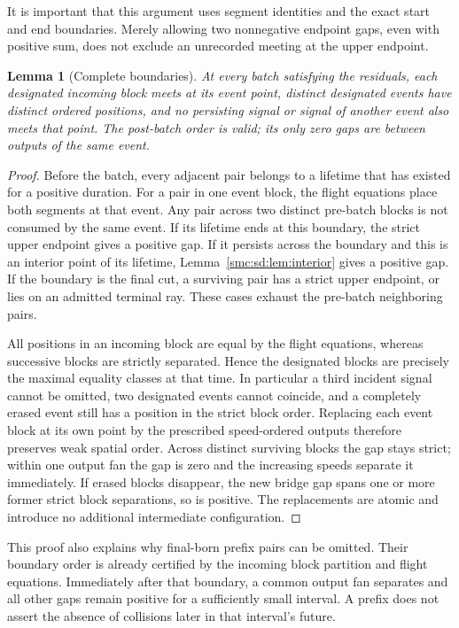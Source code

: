 \documentclass[11pt,letterpaper]{article}
\numberwithin{equation}{section}
\newtheorem{lemma}[theorem]{Lemma}
\theoremstyle{definition}
\theoremstyle{remark}
\begin{document}
It is important that this argument uses segment identities and the exact start and end boundaries. Merely allowing two nonnegative endpoint gaps, even with positive sum, does not exclude an unrecorded meeting at the upper endpoint.

\begin{lemma}[Complete boundaries]\label{smc:sd:lem:boundary}
At every batch satisfying the residuals, each designated incoming block meets at its event point, distinct designated events have distinct ordered positions, and no persisting signal or signal of another event also meets that point. The post-batch order is valid; its only zero gaps are between outputs of the same event.
\end{lemma}
\begin{proof}
Before the batch, every adjacent pair belongs to a lifetime that has existed for a positive duration. For a pair in one event block, the flight equations place both segments at that event. Any pair across two distinct pre-batch blocks is not consumed by the same event. If its lifetime ends at this boundary, the strict upper endpoint gives a positive gap. If it persists across the boundary and this is an interior point of its lifetime, Lemma~\ref{smc:sd:lem:interior} gives a positive gap. If the boundary is the final cut, a surviving pair has a strict upper endpoint, or lies on an admitted terminal ray. These cases exhaust the pre-batch neighboring pairs.

All positions in an incoming block are equal by the flight equations, whereas successive blocks are strictly separated. Hence the designated blocks are precisely the maximal equality classes at that time. In particular a third incident signal cannot be omitted, two designated events cannot coincide, and a completely erased event still has a position in the strict block order. Replacing each event block at its own point by the prescribed speed-ordered outputs therefore preserves weak spatial order. Across distinct surviving blocks the gap stays strict; within one output fan the gap is zero and the increasing speeds separate it immediately. If erased blocks disappear, the new bridge gap spans one or more former strict block separations, so is positive. The replacements are atomic and introduce no additional intermediate configuration.
\end{proof}

This proof also explains why final-born prefix pairs can be omitted. Their boundary order is already certified by the incoming block partition and flight equations. Immediately after that boundary, a common output fan separates and all other gaps remain positive for a sufficiently small interval. A prefix does not assert the absence of collisions later in that interval's future.
\end{document}
